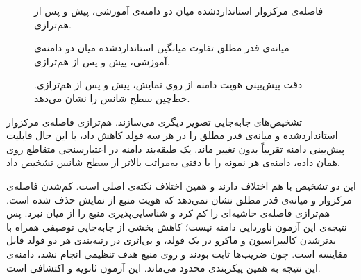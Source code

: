 \begin{figure}[htbp]
  \centering
  \caption{فاصله‌ی مرکزوار استانداردشده میان دو دامنه‌ی آموزشی، پیش و پس از هم‌ترازی.}
  \label{fig:U46}
\end{figure}

\begin{figure}[htbp]
  \centering
  \caption{میانه‌ی قدر مطلق تفاوت میانگین استانداردشده میان دو دامنه‌ی آموزشی، پیش و پس از هم‌ترازی.}
  \label{fig:U47}
\end{figure}

\begin{figure}[htbp]
  \centering
  \caption{دقت پیش‌بینی هویت دامنه از روی نمایش، پیش و پس از هم‌ترازی. خط‌چین سطح شانس را نشان می‌دهد.}
  
\end{figure}


تشخیص‌های جابه‌جایی تصویر دیگری می‌سازند. هم‌ترازی فاصله‌ی مرکزوار استانداردشده و میانه‌ی قدر مطلق  را در هر سه فولد کاهش داد، با این حال قابلیت پیش‌بینی دامنه تقریباً بدون تغییر ماند. یک طبقه‌بند دامنه در اعتبارسنجی متقاطع روی همان داده، دامنه‌ی هر نمونه را با دقتی به‌مراتب بالاتر از سطح شانس تشخیص داد.





این دو تشخیص با هم اختلاف دارند و همین اختلاف نکته‌ی اصلی است. کم‌شدن فاصله‌ی مرکزوار و میانه‌ی قدر مطلق  نشان نمی‌دهد که هویت منبع از نمایش حذف شده است. هم‌ترازی فاصله‌ی حاشیه‌ای را کم کرد و شناسایی‌پذیری منبع را از میان نبرد. پس نتیجه‌ی این آزمون ناوردایی دامنه نیست؛ کاهش بخشی از جابه‌جایی توصیفی همراه با بدترشدن کالیبراسیون و  ماکرو در یک فولد، و بی‌اثری در رتبه‌بندی هر دو فولد قابل مقایسه است. چون ضریب‌ها ثابت بودند و روی منبع هدف تنظیمی انجام نشد، دامنه‌ی این نتیجه به همین پیکربندی محدود می‌ماند. این آزمون ثانویه و اکتشافی است.

